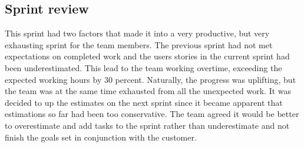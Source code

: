 \subsection{Sprint review}
This sprint had two factors that made it into a very productive, but very exhausting sprint for the team members. The previous sprint had not met expectations on completed work and the users stories in the current sprint had been underestimated. This lead to the team working overtime, exceeding the expected working hours by 30 percent. Naturally, the progress was uplifting, but the team was at the same time exhausted from all the unexpected work. It was decided to up the estimates on the next sprint since it became apparent that estimations so far had been too conservative. The team agreed it would be better to overestimate and add tasks to the sprint rather than underestimate and not finish the goals set in conjunction with the customer.